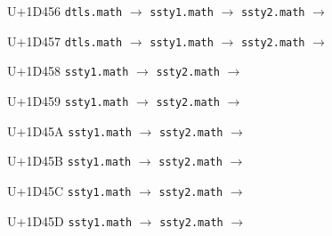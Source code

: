 \documentclass{article}
\begin{document}
\begin{substitutions}
U+1D456  \linebreak
    \texttt{dtls.math} $\to$  \linebreak
    \texttt{ssty1.math} $\to$  \linebreak
    \texttt{ssty2.math} $\to$  

\goodbreak

U+1D457  \linebreak
    \texttt{dtls.math} $\to$  \linebreak
    \texttt{ssty1.math} $\to$  \linebreak
    \texttt{ssty2.math} $\to$  

\goodbreak

U+1D458  \linebreak
    \texttt{ssty1.math} $\to$  \linebreak
    \texttt{ssty2.math} $\to$  

\goodbreak

U+1D459  \linebreak
    \texttt{ssty1.math} $\to$  \linebreak
    \texttt{ssty2.math} $\to$  

\goodbreak

U+1D45A  \linebreak
    \texttt{ssty1.math} $\to$  \linebreak
    \texttt{ssty2.math} $\to$  

\goodbreak

U+1D45B  \linebreak
    \texttt{ssty1.math} $\to$  \linebreak
    \texttt{ssty2.math} $\to$  

\goodbreak

U+1D45C  \linebreak
    \texttt{ssty1.math} $\to$  \linebreak
    \texttt{ssty2.math} $\to$  

\goodbreak

U+1D45D  \linebreak
    \texttt{ssty1.math} $\to$  \linebreak
    \texttt{ssty2.math} $\to$  


\end{substitutions}
\end{document}
